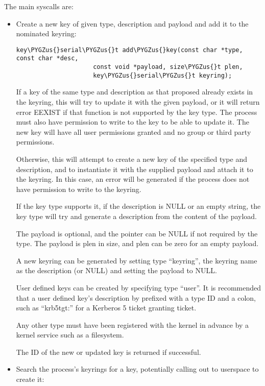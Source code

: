 \documentclass[a4paper,8pt,english]{sphinxmanual}
\def\PYGZus{\char`\_}
\begin{document}
The main syscalls are:
\begin{itemize}
\item {} 
Create a new key of given type, description and payload and add it to the
nominated keyring:

\begin{Verbatim}[commandchars=\\\{\}]
key\PYGZus{}serial\PYGZus{}t add\PYGZus{}key(const char *type, const char *desc,
                     const void *payload, size\PYGZus{}t plen,
                     key\PYGZus{}serial\PYGZus{}t keyring);
\end{Verbatim}

If a key of the same type and description as that proposed already exists
in the keyring, this will try to update it with the given payload, or it
will return error EEXIST if that function is not supported by the key
type. The process must also have permission to write to the key to be able
to update it. The new key will have all user permissions granted and no
group or third party permissions.

Otherwise, this will attempt to create a new key of the specified type and
description, and to instantiate it with the supplied payload and attach it
to the keyring. In this case, an error will be generated if the process
does not have permission to write to the keyring.

If the key type supports it, if the description is NULL or an empty
string, the key type will try and generate a description from the content
of the payload.

The payload is optional, and the pointer can be NULL if not required by
the type. The payload is plen in size, and plen can be zero for an empty
payload.

A new keyring can be generated by setting type ``keyring'', the keyring name
as the description (or NULL) and setting the payload to NULL.

User defined keys can be created by specifying type ``user''. It is
recommended that a user defined key's description by prefixed with a type
ID and a colon, such as ``krb5tgt:'' for a Kerberos 5 ticket granting
ticket.

Any other type must have been registered with the kernel in advance by a
kernel service such as a filesystem.

The ID of the new or updated key is returned if successful.

\item {} 
Search the process's keyrings for a key, potentially calling out to
userspace to create it:


\end{itemize}
\end{document}
